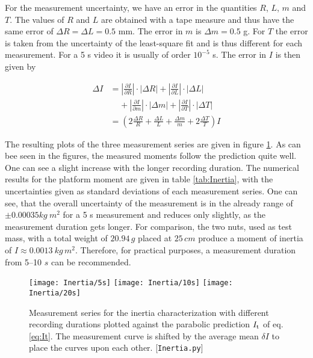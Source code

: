 \documentclass[journal]{IEEEtran}
\begin{document}
For the measurement uncertainty, we have an error in the quantities $R$, $L$, $m$ and $T$. The values of $R$ and $L$ are obtained with a tape measure and thus have the same error of $\Delta R = \Delta L = 0.5$ mm. The error in $m$ is $\Delta m = 0.5$ g. For $T$ the error is taken from the uncertainty of the least-square fit and is thus different for each measurement. For a 5 s video it is usually of order $10^{-5}$ s.
The error in $I$ is then given by

\begin{align}
	\Delta I & = \left| \frac{\partial I}{\partial R} \right| \cdot | \Delta R | + \left| \frac{\partial I}{\partial L} \right| \cdot | \Delta L | \\ &\;\;\;\; + \left| \frac{\partial I}{\partial m} \right| \cdot | \Delta m |  + \left| \frac{\partial I}{\partial T} \right| \cdot | \Delta T |\\
	& = \left( 2 \frac{\Delta R}{R} + \frac{\Delta L}{L} + \frac{\Delta m}{m} + 2 \frac{\Delta T}{T} \right) I
	\label{eq:IErr}
\end{align}

The resulting plots of the three measurement series are given in figure \ref{fig:Inertia}.
As can bee seen in the figures, the measured moments follow the prediction quite well. One can see a slight increase with the longer recording duration.
The numerical results for the platform moment are given in table \ref{tab:Inertia}, with the uncertainties given as standard deviations of each measurement series.
One can see, that the overall uncertainty of the measurement is in the already range of $\pm 0.00035 \unit{kg~m^2}$ for a 5 s measurement and reduces only slightly, as the measurement duration gets longer. For comparison, the two nuts, used as test mass, with a total weight of $20.94\,\unit{g}$ placed at $25\,\unit{cm}$ produce a moment of inertia of $I \approx 0.0013~\unit{kg\,m^2}$.
Therefore, for practical purposes, a measurement duration from 5--10 $\unit{s}$ can be recommended.

\begin{figure}[t]
	\centering
	\texttt{[image: Inertia/5s]}
	\texttt{[image: Inertia/10s]}
	\texttt{[image: Inertia/20s]}
	\caption{Measurement series for the inertia characterization with different recording durations plotted against the parabolic prediction $I_{\textup{t}}$ of eq. \eqref{eq:It}. The measurement curve is shifted by the average mean $\delta I$ to place the curves upon each other. [\texttt{Inertia.py}]}
	\label{fig:Inertia}
\end{figure}
\end{document}
